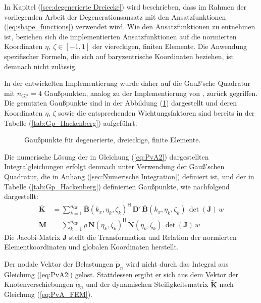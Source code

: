 In Kapitel (\ref{sec:degenerierte Dreiecke}) wird beschrieben, dass im Rahmen der vorliegenden Arbeit der Degenerationsansatz mit den Ansatzfunktionen (\ref{eq:shape_functions}) verwendet wird. Wie den Ansatzfunktionen zu entnehmen ist, beziehen sich die implementierten Ansatzfunktionen auf die normierten Koordinaten $\eta,\ \zeta \in [-1,1]$ der viereckigen, finiten Elemente.
Die Anwendung spezifischer Formeln, die sich auf baryzentrische Koordinaten beziehen, ist demnach nicht zulässig.

In der entwickelten Implementierung wurde daher auf die Gauß'sche Quadratur mit $n_{\mathrm{GP}} = 4$ Gaußpunkten, analog zu der Implementierung von \cite{Hackenberg2016}, zurück gegriffen.
Die genutzten Gaußpunkte sind in der Abbildung (\ref{fig:GP_Degeneration}) dargestellt und deren Koordinaten $\eta$, $\zeta$ sowie die entsprechenden Wichtungsfaktoren sind bereits in der Tabelle (\ref{tab:Gp_Hackenberg}) aufgeführt.
\begin{figure}[H]
	\hspace*{50mm}
	
	\caption{Gaußpunkte für degenerierte, dreieckige, finite Elemente.}
	\label{fig:GP_Degeneration}
\end{figure}

Die numerische Lösung der in Gleichung (\ref{eq:PvA2}) dargestellten Integralgleichungen erfolgt demnach unter Verwendung der Gauß'schen Quadratur, die in Anhang (\ref{sec:Numerische Integration}) definiert ist, und der in Tabelle (\ref{tab:Gp_Hackenberg})  definierten Gaußpunkte, wie nachfolgend dargestellt:
\begin{subequations}\label{eq:KM_1D_gp}
	\begin{align}
		\mathbf{\bar K}
		&= \sum_{k=1}^{n_{\mathrm{GP}}}
		\mathbf{\bar B}(k_x,\eta_k,\zeta_k)^{\mathsf H}\,
		\mathbf{D'}\,
		\mathbf{\bar B}(k_x,\eta_k,\zeta_k)\,
		\det(\mathbf{J})\,w \label{eq:K_1D_gp}\\[0.5ex]
		\mathbf{M}
		&= \sum_{k=1}^{n_{\mathrm{GP}}}
		\rho\,
		\mathbf{N}(\eta_k,\zeta_k)^{\mathsf H}\,
		\mathbf{N}(\eta_k,\zeta_k)\,
		\det(\mathbf{J})\,w \label{eq:M_1D_gp}
	\end{align}
\end{subequations}
Die Jacobi-Matrix $\mathbf{J}$ stellt die Transformation und Relation der normierten Elementkoordinaten und globalen Koordinaten herstellt.

Der nodale Vektor der Belastungen $\tilde{\mathbf p}_{n}$ wird nicht durch das Integral aus Gleichung (\ref{eq:PvA2}) gelöst.
Stattdessen ergibt er sich aus dem Vektor der Knotenverschiebungen $\tilde{\mathbf{u}}_{n}$ und der dynamischen Steifigkeitsmatrix $\tilde{\mathbf K}$ nach Gleichung (\ref{eq:PvA_FEM}).